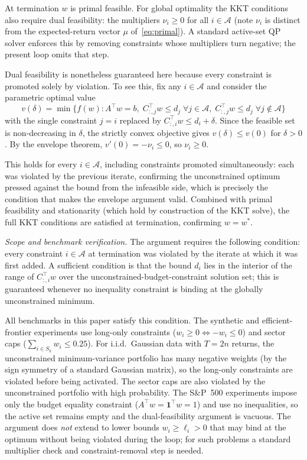 \documentclass{siam/siamart}
\begin{document}
\begin{remark}\label{rem:dualfeas}
At termination $w$ is primal feasible.  For global optimality the KKT conditions
also require dual feasibility: the multipliers $\nu_i \geq 0$ for all $i \in
\mathcal{A}$ (note $\nu_i$ is distinct from the expected-return vector $\mu$
of~\eqref{eq:primal}).  A standard active-set QP solver enforces this by removing
constraints whose multipliers turn negative; the present loop omits that step.

Dual feasibility is nonetheless guaranteed here because every constraint is promoted
solely by violation.  To see this, fix any $i \in \mathcal{A}$ and consider the
parametric optimal value
\[
  v(\delta) = \min\bigl\{f(w) : A^\top w = b,\;
    C_{:,j}^\top w \leq d_j\;\forall j \in \mathcal{A},\;
    C_{:,j}^\top w \leq d_j\;\forall j \notin \mathcal{A}\bigr\}
\]
with the single constraint $j = i$ replaced by $C_{:,i}^\top w \leq d_i + \delta$.
Since the feasible set is non-decreasing in $\delta$, the strictly convex objective
gives $v(\delta) \leq v(0)$ for $\delta > 0$.  By the envelope theorem,
$v'(0) = -\nu_i \leq 0$, so $\nu_i \geq 0$.

This holds for every $i \in \mathcal{A}$, including constraints promoted
simultaneously: each was violated by the previous iterate, confirming the
unconstrained optimum pressed against the bound from the infeasible side, which is
precisely the condition that makes the envelope argument valid.  Combined with primal
feasibility and stationarity (which hold by construction of the KKT solve), the full
KKT conditions are satisfied at termination, confirming $w = w^*$.

\emph{Scope and benchmark verification.}
The argument requires the following condition: every constraint $i \in \mathcal{A}$
at termination was violated by the iterate at which it was first added.  A
sufficient condition is that the bound $d_i$ lies in the interior of the range of
$C_{:,i}^\top w$ over the unconstrained-budget-constraint solution set; this is
guaranteed whenever no inequality constraint is binding at the globally
unconstrained minimum.

All benchmarks in this paper satisfy this condition.  The synthetic and
efficient-frontier experiments use long-only constraints ($w_i \geq 0 \Leftrightarrow
-w_i \leq 0$) and sector caps ($\sum_{i \in S_k} w_i \leq 0.25$).  For i.i.d.\
Gaussian data with $T = 2n$ returns, the unconstrained minimum-variance portfolio
has many negative weights (by the sign symmetry of a standard Gaussian matrix),
so the long-only constraints are violated before being activated.  The sector caps
are also violated by the unconstrained portfolio with high probability.  The S\&P~500
experiments impose only the budget equality constraint ($A^\top w = \mathbf{1}^\top w = 1$)
and use no inequalities, so the active set remains empty and the dual-feasibility
argument is vacuous.  The argument does \emph{not} extend to lower bounds
$w_i \geq \ell_i > 0$ that may bind at the optimum without being violated during
the loop; for such problems a standard multiplier check and constraint-removal step
is needed.
\end{remark}
\end{document}
